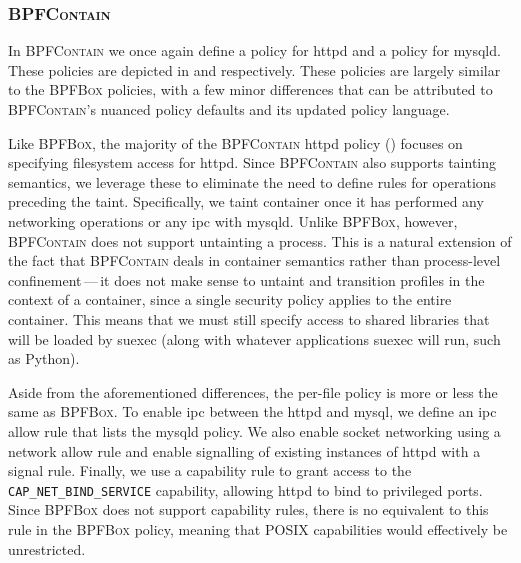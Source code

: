 \documentclass[
  fontsize=12pt,
  titlepage=firstiscover,
  paper=letter,
oneside,
  cleardoublepage=plain,
  parskip=half-,
  DIV=10,
  parindent,
  appendixprefix,
  chapterprefix,
  listof=totoc,
]{scrbook}
\newcommand{\bpfbox}{\textsc{BPFBox}}
\newcommand{\bpfcontain}{\textsc{BPFContain}}
\begin{document}
\subsubsection{\bpfcontain{}}

In \bpfcontain{} we once again define a policy for httpd and a policy for mysqld.  These
policies are depicted in  and 
respectively. These policies are largely similar to the \bpfbox{} policies, with a few
minor differences that can be attributed to \bpfcontain{}'s nuanced policy defaults and
its updated policy language.

Like \bpfbox{}, the majority of the \bpfcontain{} httpd policy
() focuses on specifying filesystem access for httpd. Since
\bpfcontain{} also supports tainting semantics, we leverage these to eliminate the need to
define rules for operations preceding the taint. Specifically, we taint container once it
has performed any networking operations or any \gls{ipc} with mysqld. Unlike \bpfbox{},
however, \bpfcontain{} does not support untainting a process. This is a natural extension
of the fact that \bpfcontain{} deals in container semantics rather than process-level
confinement\,---\,it does not make sense to untaint and transition profiles in the context
of a container, since a single security policy applies to the entire container. This
means that we must still specify access to shared libraries that will be loaded by suexec
(along with whatever applications suexec will run, such as Python).

Aside from the aforementioned differences, the per-file policy is more or less the same as
\bpfbox{}. To enable \gls{ipc} between the httpd and mysql, we define an \gls{ipc} allow
rule that lists the mysqld policy. We also enable socket networking using a network allow
rule and enable signalling of existing instances of httpd with a signal rule. Finally, we
use a capability rule to grant access to the \texttt{CAP\_NET\_BIND\_SERVICE} capability,
allowing httpd to bind to privileged ports. Since \bpfbox{} does not support capability
rules, there is no equivalent to this rule in the \bpfbox{} policy, meaning that POSIX
capabilities would effectively be unrestricted.
\end{document}
